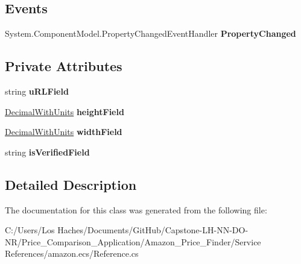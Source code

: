\subsection*{Events}
\begin{DoxyCompactItemize}
\item 
\hypertarget{class_price___comparison_1_1amazon_1_1ecs_1_1_image_a1928840809aea5023e40888a3514ea56}{System.\-Component\-Model.\-Property\-Changed\-Event\-Handler {\bfseries Property\-Changed}}\label{class_price___comparison_1_1amazon_1_1ecs_1_1_image_a1928840809aea5023e40888a3514ea56}

\end{DoxyCompactItemize}
\subsection*{Private Attributes}
\begin{DoxyCompactItemize}
\item 
\hypertarget{class_price___comparison_1_1amazon_1_1ecs_1_1_image_a656774fdadaa2de7be0cea935d678065}{string {\bfseries u\-R\-L\-Field}}\label{class_price___comparison_1_1amazon_1_1ecs_1_1_image_a656774fdadaa2de7be0cea935d678065}

\item 
\hypertarget{class_price___comparison_1_1amazon_1_1ecs_1_1_image_a6b1a8d9c27ff5e5f71c220ce3396f894}{\hyperlink{class_price___comparison_1_1amazon_1_1ecs_1_1_decimal_with_units}{Decimal\-With\-Units} {\bfseries height\-Field}}\label{class_price___comparison_1_1amazon_1_1ecs_1_1_image_a6b1a8d9c27ff5e5f71c220ce3396f894}

\item 
\hypertarget{class_price___comparison_1_1amazon_1_1ecs_1_1_image_a422b73963f34face884d4312a75dddc8}{\hyperlink{class_price___comparison_1_1amazon_1_1ecs_1_1_decimal_with_units}{Decimal\-With\-Units} {\bfseries width\-Field}}\label{class_price___comparison_1_1amazon_1_1ecs_1_1_image_a422b73963f34face884d4312a75dddc8}

\item 
\hypertarget{class_price___comparison_1_1amazon_1_1ecs_1_1_image_a0a18f0cb0cf69123aa98409c8c290b19}{string {\bfseries is\-Verified\-Field}}\label{class_price___comparison_1_1amazon_1_1ecs_1_1_image_a0a18f0cb0cf69123aa98409c8c290b19}

\end{DoxyCompactItemize}


\subsection{Detailed Description}


The documentation for this class was generated from the following file\-:\begin{DoxyCompactItemize}
\item 
C\-:/\-Users/\-Los Haches/\-Documents/\-Git\-Hub/\-Capstone-\/\-L\-H-\/\-N\-N-\/\-D\-O-\/\-N\-R/\-Price\-\_\-\-Comparison\-\_\-\-Application/\-Amazon\-\_\-\-Price\-\_\-\-Finder/\-Service References/amazon.\-ecs/Reference.\-cs\end{DoxyCompactItemize}

